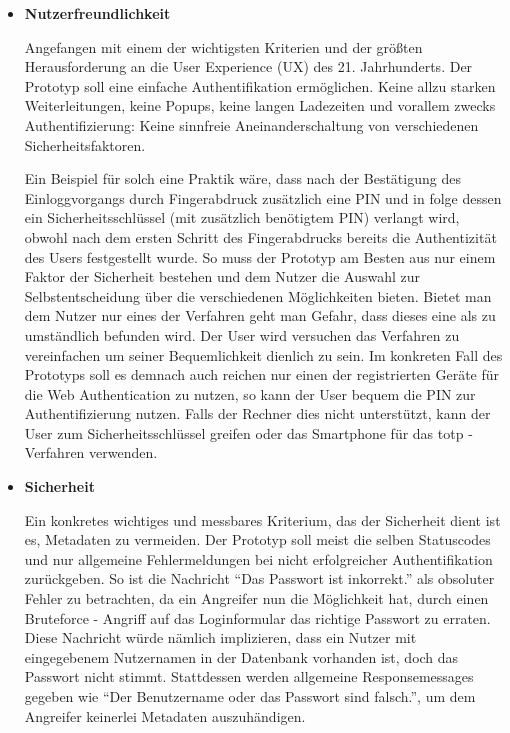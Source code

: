 \begin{itemize} 
\item \textbf{Nutzerfreundlichkeit}

Angefangen mit einem der wichtigsten Kriterien und der größten Herausforderung an die User Experience (UX) des 21. Jahrhunderts. Der Prototyp soll eine einfache Authentifikation ermöglichen. Keine allzu starken Weiterleitungen, keine Popups, keine langen Ladezeiten und vorallem zwecks Authentifizierung: Keine sinnfreie Aneinanderschaltung von verschiedenen Sicherheitsfaktoren.
\newpage

Ein Beispiel für solch eine Praktik wäre, dass nach der Bestätigung des Einloggvorgangs durch Fingerabdruck zusätzlich eine PIN und in folge dessen ein Sicherheitsschlüssel (mit zusätzlich benötigtem PIN) verlangt wird, obwohl nach dem ersten Schritt des Fingerabdrucks bereits die Authentizität des Users festgestellt wurde. So muss der Prototyp am Besten aus nur einem Faktor der Sicherheit bestehen und dem Nutzer die Auswahl zur Selbstentscheidung über die verschiedenen Möglichkeiten bieten. Bietet man dem Nutzer nur eines der Verfahren geht man Gefahr, dass dieses eine als zu umständlich befunden wird. Der User wird versuchen das Verfahren zu vereinfachen um seiner Bequemlichkeit dienlich zu sein. Im konkreten Fall des Prototyps soll es demnach auch reichen nur einen der registrierten Geräte für die Web Authentication zu nutzen, so kann der User bequem die PIN zur Authentifizierung nutzen. Falls der Rechner dies nicht unterstützt, kann der User zum Sicherheitsschlüssel greifen oder das Smartphone für das \ac{totp} - Verfahren verwenden.

\item \textbf{Sicherheit}

Ein konkretes wichtiges und messbares Kriterium, das der Sicherheit dient ist es, Metadaten zu vermeiden. Der Prototyp soll meist die selben Statuscodes und nur allgemeine Fehlermeldungen bei nicht erfolgreicher Authentifikation zurückgeben. So ist die Nachricht ``Das Passwort ist inkorrekt.'' als obsoluter Fehler zu betrachten, da ein Angreifer nun die Möglichkeit hat, durch einen Bruteforce - Angriff auf das Loginformular das richtige Passwort zu erraten. Diese Nachricht würde nämlich implizieren, dass ein Nutzer mit eingegebenem Nutzernamen in der Datenbank vorhanden ist, doch das Passwort nicht stimmt. Stattdessen werden allgemeine Responsemessages gegeben wie ``Der Benutzername oder das Passwort sind falsch.'', um dem Angreifer keinerlei Metadaten auszuhändigen.


\end{itemize}
